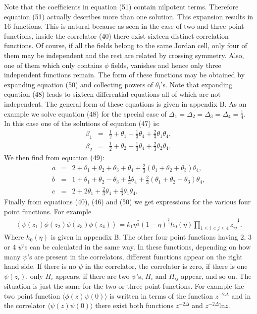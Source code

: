 \documentclass[a4paper,11pt]{article}
\begin{document}
Note that the coefficients in equation (51) contain nilpotent
terms. Therefore equation (51) actually describes more than one
solution. This expansion results in 16 functions. This is natural
because as seen in the case of two and three point functions,
inside the correlator (40) there exist sixteen distinct
correlation functions. Of course, if all the fields belong to the
same Jordan cell, only four of them may be independent and the
rest are related by crossing symmetry. Also, one of them which
only contains $\phi$ fields, vanishes and hence only three
independent functions remain. The form of these functions may be
obtained by expanding equation (50) and collecting powers of
$\theta_{i}$'s. Note that expanding equation (48) leads to
sixteen differential equations all of which are not independent.
The general form of these equations is given in appendix B. As an
example we solve equation (48) for the special case of $
\Delta_{1}=\Delta_{2}=\Delta_{3}=\Delta_{4}=\frac{1}{4}$. In this
case one of the solutions of equation (47) is:
\begin{eqnarray}
\beta_{1}&=&\frac{1}{2}+\theta_{1}-\frac{1}
{3}\theta_{4}+\frac{2}{3}\theta_{1}\theta_{4} ,\nonumber\\
\beta_{2}&=&\frac{1}{2}+\theta_{2}-\frac{1}{3}
\theta_{4}+\frac{2}{3}\theta_{2}\theta_{4} .
\end{eqnarray}
We then find from equation (49):
\begin{eqnarray}
a&=&2+\theta_{1}+\theta_{2}+\theta_{3}+\theta_{4}
+\frac{2}{3}(\theta_{1}+\theta_{2}+\theta_{3}) \theta_{4} ,
\nonumber\\ b&=&1+\theta_{1}+\theta_{2}-\theta_{3}+
\frac{1}{3}\theta_{4}+\frac{2}{3}(\theta_{1}+\theta_{2}-\theta_{3})
\theta_{4} ,\nonumber\\
c&=&2+2\theta_{1}+\frac{2}{3}\theta_{4}+\frac{4}{3}\theta_{1}
\theta_{4} .
\end{eqnarray}
Finally from equations (40), (46) and (50) we get expressions for
the various four point functions. For example
\begin{eqnarray}
\left<\psi(z_{1})\phi(z_{2})\phi(z_{3})\phi(z_{4})
\right>=k_{1}\eta^{\frac{2}{3}}(1-\eta)^{\frac{2}{3}}h_{0}(\eta)\prod_{1\leq
i<j\leq4}z_{ij}^{-\frac{1}{6}} .
\end{eqnarray}
Where $h_{0}(\eta)$ is given in appendix B. The other four point
functions having 2, 3 or 4 $\psi$'s can be calculated in the same
way. In these functions, depending on how many $\psi$'s are
present in the correlators, different functions appear on the
right hand side. If there is no $\psi$ in the correlator, the
correlator is zero, if there is one $\psi(z_{i})$, only $H_{i}$
appears, if there are two $\psi$'s, $H_{i}$ and $H_{ij}$ appear,
and so on. The situation is just the same for the two or three
point functions. For example the two point function $\langle \phi
(z) \psi(0) \rangle$ is written in terms of the function
$z^{-2\Delta}$ and in the correlator $\langle \psi (z) \psi(0)
\rangle$ there exist both functions $z^{-2\Delta}$ and
$z^{-2\Delta}$ln$z$.
\end{document}
